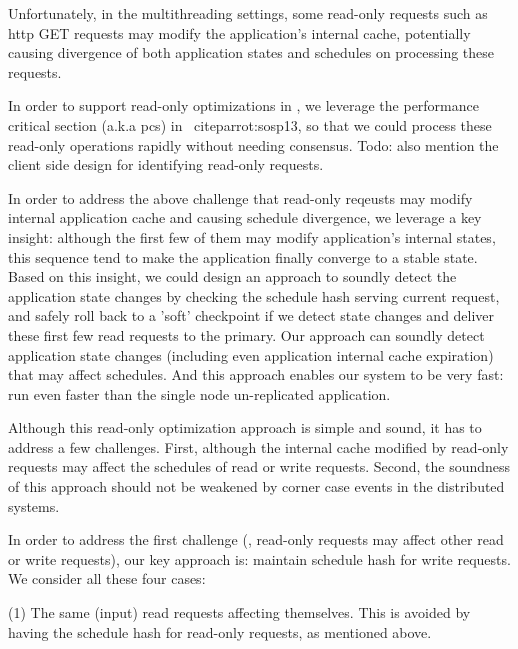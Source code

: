 Unfortunately, in the multithreading settings, some read-only requests such as http GET requests may
modify the application's internal cache, potentially causing divergence of both application states and 
schedules on processing these requests.

In order to support read-only optimizations in \msmr, we leverage the performance critical 
section (a.k.a pcs) in \parrot~cite{parrot:sosp13}, so that we could process 
these read-only operations rapidly without needing consensus. Todo: also 
mention the client side design for identifying read-only requests.

In order to address the above challenge that read-only reqeusts may modify internal 
application cache and causing schedule divergence, we leverage a key 
insight: although the first few of them may modify application's internal states, this 
sequence tend to make the application finally converge to a stable state. Based 
on this insight, we could design an approach to soundly detect the application 
state changes by checking the schedule hash serving current request, and 
safely roll back to a 'soft' checkpoint if we detect state changes and 
deliver these first few read requests to the primary. Our approach can soundly 
detect application state changes (including even application internal cache 
expiration) that may affect schedules. And this approach enables our system 
to be very fast: run even faster than the single node un-replicated 
application.

Although this read-only optimization approach is simple and sound, it has to 
address a few challenges. First, although the internal cache modified by read-only 
requests may affect the schedules of read or write requests. Second, the 
soundness of this approach should not be weakened by corner case events in the 
distributed systems.

In order to address the first challenge (\ie, read-only requests may affect 
other read or write requests), our key approach is: maintain schedule hash for write 
requests. We consider all these four cases:

(1) The same (input) read requests affecting themselves. This is avoided by 
having the schedule hash for read-only requests, as mentioned above.

